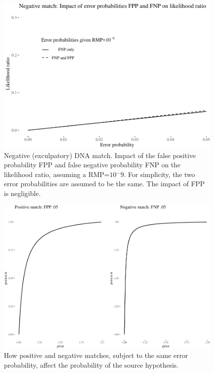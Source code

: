 \documentclass[
  10pt,
  dvipsnames,enabledeprecatedfontcommands]{scrartcl}
\begin{document}
\begin{figure}[t]

\begin{center}\includegraphics[width=1\linewidth]{lr-chapter4_files/figure-latex/fig-fpfnplr-exc-1} \end{center}
\caption{Negative (exculpatory) DNA match. Impact of the false positive probability FPP and false negative probability FNP on the likelihood ratio, assuming a RMP=$10{^-9}$. For simplicity, the two error probabilities are assumed to be the same. The impact of FPP is negligible.}
\label{fig:fpfnplr-exc}
\end{figure}

\begin{figure}[h]

\begin{center}\includegraphics[width=1\linewidth]{lr-chapter4_files/figure-latex/ex-inc-dna-b-1} \end{center}
\caption{How positive and negative matches, subject to the same error probability, affect the probability of the source hypothesis.}
\label{fig:ex-inc-dna}
\end{figure}
\end{document}
